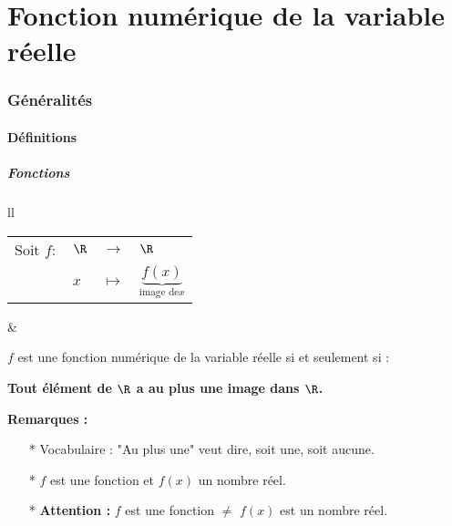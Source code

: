 \setcounter{section}{0}

\vspace*{-2cm} 

\part{Fonction numérique de la variable réelle}

\section{Généralités}

\subsection{Définitions}

\subsubsection{Fonctions}

\begin{tabular}{ll}
\begin{minipage}{4cm}
\begin{tabular}{llll}
\hspace{-.5cm} Soit $f:$ & $ \R$ &  $\rightarrow$ & $\R$ \\
& $x$ & $\mapsto$ & \hspace*{-.5cm}$\underbrace{f(x)}_{\textrm{image de} x}$ \\
\end{tabular}
\end{minipage}
&
\begin{minipage}{11cm}
$f$ est une fonction numérique de la variable réelle si et seulement si :

\textbf{Tout élément de $\mathbf{\R}$ a au plus une image dans $\mathbf{\R}$.} \\
\end{minipage}
\end{tabular}

\vspace*{.3cm}

\textbf{Remarques :}

\begin{itemize}

\item[*]Vocabulaire : "Au plus une" veut dire, soit une, soit aucune. 

\item[*] $f$ est une fonction et $f(x)$ un nombre réel.

\item[*] \textbf{Attention :} $f$ est une fonction $\neq$ $f(x)$ est un nombre réel.
\end{itemize}


